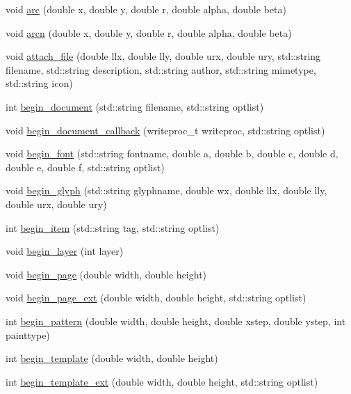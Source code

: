 \begin{DoxyCompactItemize}
\item 
void \hyperlink{classPDFlib_aee884c54b243c01230926f493f06eaf9}{arc} (double x, double y, double r, double alpha, double beta)
\item 
void \hyperlink{classPDFlib_a061eb6bb4e041c52547cf9d58416ddac}{arcn} (double x, double y, double r, double alpha, double beta)
\item 
void \hyperlink{classPDFlib_a911b3c91d2670200cdb3b78742fc6980}{attach\+\_\+file} (double llx, double lly, double urx, double ury, std\+::string filename, std\+::string description, std\+::string author, std\+::string mimetype, std\+::string icon)
\item 
int \hyperlink{classPDFlib_aacb38db7f6eada3409fb616bd823e79f}{begin\+\_\+document} (std\+::string filename, std\+::string optlist)
\item 
void \hyperlink{classPDFlib_a0c3289b502ca325c222c4df9c8318d1f}{begin\+\_\+document\+\_\+callback} (writeproc\+\_\+t writeproc, std\+::string optlist)
\item 
void \hyperlink{classPDFlib_a3f8a5ee80b6c632c1687e3100ef4a1bb}{begin\+\_\+font} (std\+::string fontname, double a, double b, double c, double d, double e, double f, std\+::string optlist)
\item 
void \hyperlink{classPDFlib_adeb917523298b8df07d5a0161dca81ca}{begin\+\_\+glyph} (std\+::string glyphname, double wx, double llx, double lly, double urx, double ury)
\item 
int \hyperlink{classPDFlib_a0df23d2d6f9a6a100878bad9b8936e6c}{begin\+\_\+item} (std\+::string tag, std\+::string optlist)
\item 
void \hyperlink{classPDFlib_ac35bac599211da4f97c13bf5d752ca4f}{begin\+\_\+layer} (int layer)
\item 
void \hyperlink{classPDFlib_a311dccd5a1ac04646673e6eaeea476ae}{begin\+\_\+page} (double width, double height)
\item 
void \hyperlink{classPDFlib_ac656d2651dab7cd9dc27e6fb7e24674b}{begin\+\_\+page\+\_\+ext} (double width, double height, std\+::string optlist)
\item 
int \hyperlink{classPDFlib_a4f448cf3fb5e4376c8f5665b209309b2}{begin\+\_\+pattern} (double width, double height, double xstep, double ystep, int painttype)
\item 
int \hyperlink{classPDFlib_a0a17dc423a0b09f0fe3da38184a0c58a}{begin\+\_\+template} (double width, double height)
\item 
int \hyperlink{classPDFlib_af52208d3c75b94fa260e930379add01e}{begin\+\_\+template\+\_\+ext} (double width, double height, std\+::string optlist)

\end{DoxyCompactItemize}
